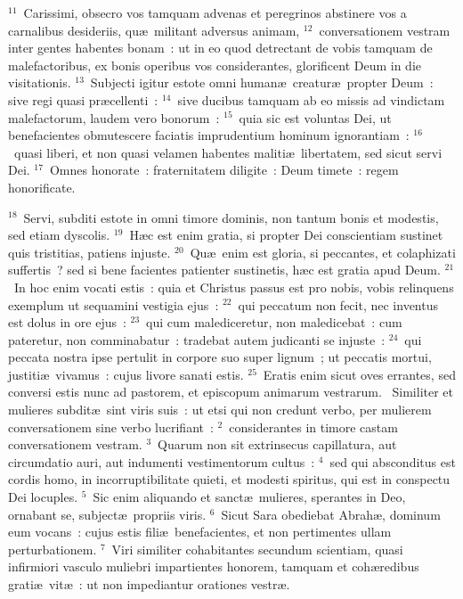 ${}^{11}$~Carissimi, obsecro vos tamquam advenas et peregrinos abstinere vos a carnalibus desideriis, qu\ae\ militant adversus animam,
${}^{12}$~conversationem vestram inter gentes habentes bonam~: ut in eo quod detrectant de vobis tamquam de malefactoribus, ex bonis operibus vos considerantes, glorificent Deum in die visitationis.
${}^{13}$~Subjecti igitur estote omni human\ae\ creatur\ae\ propter Deum~: sive regi quasi pr\ae cellenti~:
${}^{14}$~sive ducibus tamquam ab eo missis ad vindictam malefactorum, laudem vero bonorum~:
${}^{15}$~quia sic est voluntas Dei, ut benefacientes obmutescere faciatis imprudentium hominum ignorantiam~:
${}^{16}$~quasi liberi, et non quasi velamen habentes maliti\ae\ libertatem, sed sicut servi Dei.
${}^{17}$~Omnes honorate~: fraternitatem diligite~: Deum timete~: regem honorificate.


${}^{18}$~Servi, subditi estote in omni timore dominis, non tantum bonis et modestis, sed etiam dyscolis.
${}^{19}$~H\ae c est enim gratia, si propter Dei conscientiam sustinet quis tristitias, patiens injuste.
${}^{20}$~Qu\ae\ enim est gloria, si peccantes, et colaphizati suffertis~? sed si bene facientes patienter sustinetis, h\ae c est gratia apud Deum.
${}^{21}$~In hoc enim vocati estis~: quia et Christus passus est pro nobis, vobis relinquens exemplum ut sequamini vestigia ejus~:
${}^{22}$~qui peccatum non fecit, nec inventus est dolus in ore ejus~:
${}^{23}$~qui cum malediceretur, non maledicebat~: cum pateretur, non comminabatur~: tradebat autem judicanti se injuste~:
${}^{24}$~qui peccata nostra ipse pertulit in corpore suo super lignum~; ut peccatis mortui, justiti\ae\ vivamus~: cujus livore sanati estis.
${}^{25}$~Eratis enim sicut oves errantes, sed conversi estis nunc ad pastorem, et episcopum animarum vestrarum.
~\lettrine[lines=10,image=true,loversize=0.05,lraise=-0.03]{S}{}imiliter et mulieres subdit\ae\ sint viris suis~: ut etsi qui non credunt verbo, per mulierem conversationem sine verbo lucrifiant~:
${}^{2}$~considerantes in timore castam conversationem vestram.
${}^{3}$~Quarum non sit extrinsecus capillatura, aut circumdatio auri, aut indumenti vestimentorum cultus~:
${}^{4}$~sed qui absconditus est cordis homo, in incorruptibilitate quieti, et modesti spiritus, qui est in conspectu Dei locuples.
${}^{5}$~Sic enim aliquando et sanct\ae\ mulieres, sperantes in Deo, ornabant se, subject\ae\ propriis viris.
${}^{6}$~Sicut Sara obediebat Abrah\ae , dominum eum vocans~: cujus estis fili\ae\ benefacientes, et non pertimentes ullam perturbationem.
${}^{7}$~Viri similiter cohabitantes secundum scientiam, quasi infirmiori vasculo muliebri impartientes honorem, tamquam et coh\ae redibus grati\ae\ vit\ae~: ut non impediantur orationes vestr\ae .


